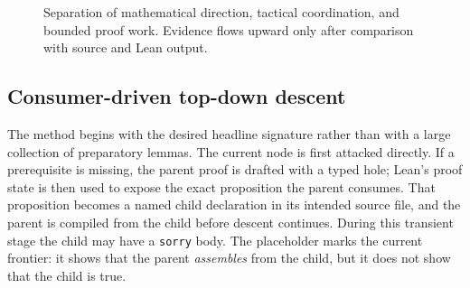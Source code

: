 \documentclass[11pt]{article}
\theoremstyle{plain}
\theoremstyle{definition}
\theoremstyle{remark}
\begin{document}
\begin{figure}[htbp]
\centering
{}
\caption{Separation of mathematical direction, tactical coordination, and
bounded proof work.  Evidence flows upward only after comparison with source
and Lean output.}
\label{fig:auto-formalization-three-tier}
\end{figure}

\subsection{Consumer-driven top-down descent}

The method begins with the desired headline signature rather than with a large
collection of preparatory lemmas.  The current node is first attacked directly.
If a prerequisite is missing, the parent proof is drafted with a typed hole;
Lean's proof state is then used to expose the exact proposition the parent
consumes.  That proposition becomes a named child declaration in its intended
source file, and the parent is compiled from the child before descent
continues.  During this transient stage the child may have a \texttt{sorry}
body.  The placeholder marks the current frontier: it shows that the parent
\emph{assembles} from the child, but it does not show that the child is true.
\end{document}
